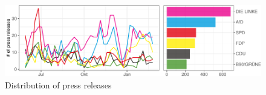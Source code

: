 \documentclass[
]{article}
\begin{document}
\begin{figure}

{\centering \includegraphics[width=0.7\linewidth]{main_text_files/figure-latex/Distribution of press releases-1} 

}

\caption{Distribution of press releases \label{fig:press_distr}}\label{fig:Distribution of press releases}
\end{figure}

\begin{table}[H]


\end{table}
\end{document}
